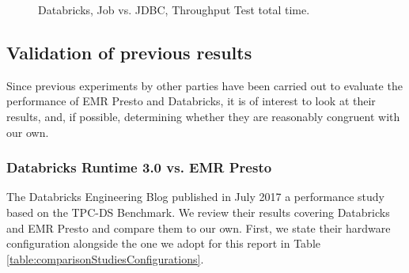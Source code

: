 \begin{figure}
   \begin{center}
   \end{center}
   \caption{Databricks, Job vs. JDBC, Throughput Test total time.}
   \label{fig:validationExperimentsDatabricksJDBCTputTest}
\end{figure}

\subsection{Validation of previous results}

Since previous experiments by other parties have been carried out to evaluate the performance of EMR Presto and Databricks, it is of interest to look at their results, and, if possible, determining whether they are reasonably congruent with our own.

\subsubsection{Databricks Runtime 3.0 vs. EMR Presto}

The Databricks Engineering Blog published in July 2017 a performance study \cite{starburstReport} based on the TPC-DS Benchmark. We review their results covering Databricks and EMR Presto and compare them to our own. First, we state their hardware configuration alongside the one we adopt for this report in Table \ref{table:comparisonStudiesConfigurations}.

